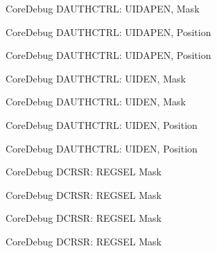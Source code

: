 \begin{DoxyRefList}
\label{deprecated__deprecated000533}%
%
Core\+Debug D\+A\+U\+T\+H\+C\+T\+RL\+: U\+I\+D\+A\+P\+EN, Mask  
\item[Member \mbox{\hyperlink{group__CMSIS__CoreDebug_ga57a2ef70f6cc1e0903a8c3740512de46}{Core\+Debug\+\_\+\+D\+A\+U\+T\+H\+C\+T\+R\+L\+\_\+\+U\+I\+D\+A\+P\+E\+N\+\_\+\+Pos}} ]\label{deprecated__deprecated000081}%
%
Core\+Debug D\+A\+U\+T\+H\+C\+T\+RL\+: U\+I\+D\+A\+P\+EN, Position 

\label{deprecated__deprecated000532}%
%
Core\+Debug D\+A\+U\+T\+H\+C\+T\+RL\+: U\+I\+D\+A\+P\+EN, Position  
\item[Member \mbox{\hyperlink{group__CMSIS__CoreDebug_ga7d84e1642469f5c20b7ef7fa76a4fe95}{Core\+Debug\+\_\+\+D\+A\+U\+T\+H\+C\+T\+R\+L\+\_\+\+U\+I\+D\+E\+N\+\_\+\+Msk}} ]\label{deprecated__deprecated000080}%
%
Core\+Debug D\+A\+U\+T\+H\+C\+T\+RL\+: U\+I\+D\+EN, Mask 

\label{deprecated__deprecated000531}%
%
Core\+Debug D\+A\+U\+T\+H\+C\+T\+RL\+: U\+I\+D\+EN, Mask  
\item[Member \mbox{\hyperlink{group__CMSIS__CoreDebug_gab9cb997565a842f5eb9365bd58d7cda2}{Core\+Debug\+\_\+\+D\+A\+U\+T\+H\+C\+T\+R\+L\+\_\+\+U\+I\+D\+E\+N\+\_\+\+Pos}} ]\label{deprecated__deprecated000079}%
%
Core\+Debug D\+A\+U\+T\+H\+C\+T\+RL\+: U\+I\+D\+EN, Position 

\label{deprecated__deprecated000530}%
%
Core\+Debug D\+A\+U\+T\+H\+C\+T\+RL\+: U\+I\+D\+EN, Position  
\item[Member \mbox{\hyperlink{group__CMSIS__CoreDebug_ga17cafbd72b55030219ce5609baa7c01d}{Core\+Debug\+\_\+\+D\+C\+R\+S\+R\+\_\+\+R\+E\+G\+S\+E\+L\+\_\+\+Msk}} ]\label{deprecated__deprecated000044}%
%
Core\+Debug D\+C\+R\+SR\+: R\+E\+G\+S\+EL Mask 

\label{deprecated__deprecated000132}%
%
Core\+Debug D\+C\+R\+SR\+: R\+E\+G\+S\+EL Mask 

\label{deprecated__deprecated000188}%
%
Core\+Debug D\+C\+R\+SR\+: R\+E\+G\+S\+EL Mask 

\label{deprecated__deprecated000271}%
%
Core\+Debug D\+C\+R\+SR\+: R\+E\+G\+S\+EL Mask 


\end{DoxyRefList}

